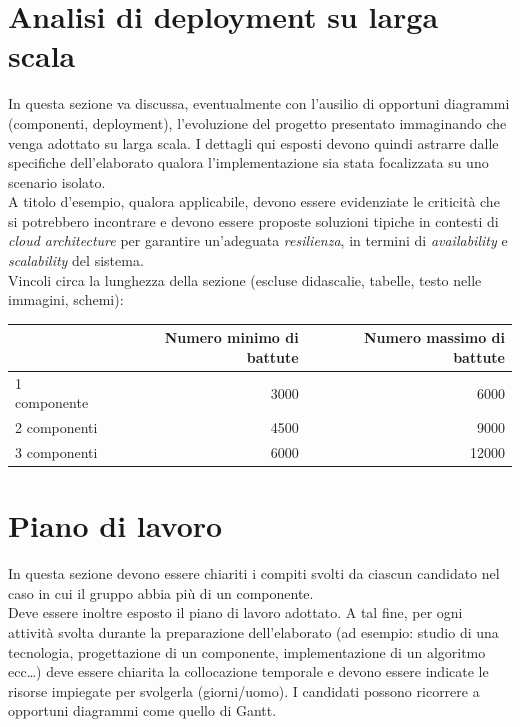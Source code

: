 \documentclass[12pt]{article}
\begin{document}
\section{Analisi di deployment su larga scala}

In questa sezione va discussa, eventualmente con l'ausilio di opportuni diagrammi (componenti, deployment), l'evoluzione del progetto presentato immaginando che venga adottato su larga scala. I dettagli qui esposti devono quindi astrarre dalle specifiche dell'elaborato qualora l'implementazione sia stata focalizzata su uno scenario isolato.\\

A titolo d’esempio, qualora applicabile, devono essere evidenziate le criticità che si potrebbero incontrare e devono essere proposte soluzioni tipiche in contesti di \textit{cloud architecture} per garantire un'adeguata \textit{resilienza}, in termini di \textit{availability} e \textit{scalability} del sistema.\\


Vincoli circa la lunghezza della sezione (escluse didascalie, tabelle, testo nelle immagini, schemi):

\vspace{1cm}
\begin{tabular}{l|rr}
 & Numero minimo di battute & Numero massimo di battute \\
 \hline
 1 componente & 3000 & 6000 \\
 2 componenti & 4500 & 9000 \\
 3 componenti & 6000 & 12000 \\
 \hline
\end{tabular}


\newpage



\section{Piano di lavoro}

In questa sezione devono essere chiariti i compiti svolti da ciascun candidato nel caso in cui il gruppo abbia più di un componente.\\

Deve essere inoltre esposto il piano di lavoro adottato. A tal fine, per ogni attività svolta durante la preparazione dell'elaborato (ad esempio: studio di una tecnologia, progettazione di un componente, implementazione di un algoritmo ecc…) deve essere chiarita la collocazione temporale e devono essere indicate le risorse impiegate per svolgerla (giorni/uomo). I candidati possono ricorrere a opportuni diagrammi come quello di Gantt.\\
\end{document}
